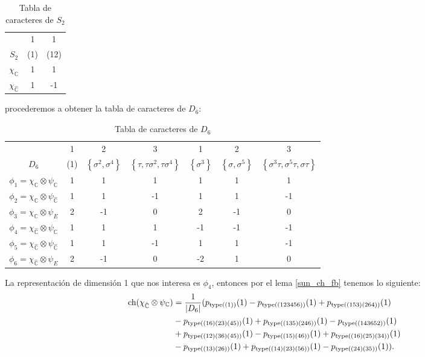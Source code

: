 \documentclass[12pt]{book}
\theoremstyle{definition}
\newcounter{in}
\begin{document}
\begin{table}[H]
  \centering
  \begin{tabular}{ c| c c}
      & 1 & 1 \\
      $S_{2}$ & (1) & (12) \\
      \hline
      $\chi_{\mathbb{C}}$ & 1 & 1 \\
      $\chi_{\mathbb{\hat C}}$ & 1 & -1
    \end{tabular}
    
  \caption{Tabla de caracteres de $S_{2}$}
  \label{tabla-car-S2}
\end{table}
procederemos a obtener la tabla de caracteres de $D_{6}$:
\begin{table}[H]
  \centering
  \begin{tabular}{ c| c c c c c c}
      & 1 & 2 & 3 & 1 & 2 & 3 \\
      $D_{6}$ & (1) & $\left \{ \sigma^{2}, \sigma^{4} \right \}$ & $\left \{ \tau, \tau \sigma^{2}, \tau \sigma^{4} \right \}$ & $\left \{ \sigma^{3} \right \}$ & $\left \{ \sigma, \sigma^{5} \right \}$ & $\left \{ \sigma^{3} \tau, \sigma^{5} \tau, \sigma \tau \right \}$\\
      \hline
      $\phi_{1} = \chi_{\mathbb{C}} \otimes \psi_{\mathbb{C}}$ & 1 & 1 & 1 & 1 & 1 & 1\\
      $\phi_{2} = \chi_{\mathbb{C}} \otimes \psi_{\mathbb{\hat C}}$ & 1 & 1 & -1 & 1 & 1 & -1\\
      $\phi_{3} = \chi_{\mathbb{C}} \otimes \psi_{E}$ & 2 & -1 & 0 & 2 & -1 & 0\\
      $\phi_{4} = \chi_{\mathbb{\hat C}} \otimes \psi_{\mathbb{C}}$ & 1 & 1 & 1 & -1 & -1 & -1\\
      $\phi_{5} = \chi_{\mathbb{\hat C}} \otimes \psi_{\mathbb{\hat C}}$ & 1 & 1 & -1 & 1 & 1 & -1\\
      $\phi_{6} = \chi_{\mathbb{\hat C}} \otimes \psi_{E}$ & 2 & -1 & 0 & -2 & 1 & 0
    \end{tabular}
  \caption{Tabla de caracteres de $D_{6}$}
  \label{tabla-car-S3}
\end{table}
La representación de dimensión 1 que nos interesa es $\phi_{4}$, entonces por el lema \ref{sun_ch_fb} tenemos lo siguiente:
\begin{equation}
\begin{aligned}
\textup{ch}(\chi_{\mathbb{\hat C}} \otimes \psi_{\mathbb{C}}) &=\frac{1}{|D_{6}|}(p_{\textup{type}((1))}(1)-p_{\textup{type}((123456))}(1)+p_{\textup{type}((153)(264))}(1)\\
& -p_{\textup{type}((16)(23)(45))}(1)+p_{\textup{type}((135)(246))}(1) - p_{\textup{type}((143652))}(1) \\
&  + p_{\textup{type}((12)(36)(45))}(1) - p_{\textup{type}((15)(46))}(1) + p_{\textup{type}((16)(25)(34))}(1)  \\
& - p_{\textup{type}((13)(26))}(1) + p_{\textup{type}((14)(23)(56))}(1) - p_{\textup{type}((24)(35))}(1)). 
\end{aligned}
\end{equation}
\end{document}
